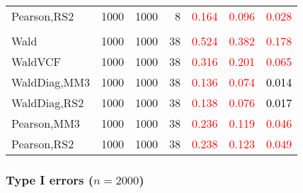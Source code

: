 \documentclass[
]{article}
\begin{document}
\begin{table}[H]
{\begin{tabular}[t]{lrrrrrr}
\hspace{1em}Pearson,RS2 & 1000 & 1000 & 8 & \textcolor{red}{0.164} & \textcolor{red}{0.096} & \textcolor{red}{0.028}\\
\addlinespace[0.3em]
\multicolumn{7}{l}{\textbf{3F 15V}}\\
\hspace{1em}Wald & 1000 & 1000 & 38 & \textcolor{red}{0.524} & \textcolor{red}{0.382} & \textcolor{red}{0.178}\\
\hspace{1em}WaldVCF & 1000 & 1000 & 38 & \textcolor{red}{0.316} & \textcolor{red}{0.201} & \textcolor{red}{0.065}\\
\hspace{1em}WaldDiag,MM3 & 1000 & 1000 & 38 & \textcolor{red}{0.136} & \textcolor{red}{0.074} & \textcolor{black}{0.014}\\
\hspace{1em}WaldDiag,RS2 & 1000 & 1000 & 38 & \textcolor{red}{0.138} & \textcolor{red}{0.076} & \textcolor{black}{0.017}\\
\hspace{1em}Pearson,MM3 & 1000 & 1000 & 38 & \textcolor{red}{0.236} & \textcolor{red}{0.119} & \textcolor{red}{0.046}\\
\hspace{1em}Pearson,RS2 & 1000 & 1000 & 38 & \textcolor{red}{0.238} & \textcolor{red}{0.123} & \textcolor{red}{0.049}\\
\bottomrule
\end{tabular}}
\endgroup{}
\end{table}

\hypertarget{type-i-errors-n2000-1}{%
\subsubsection{\texorpdfstring{Type I errors
(\(n=2000\))}{Type I errors (n=2000)}}\label{type-i-errors-n2000-1}}
\end{document}
